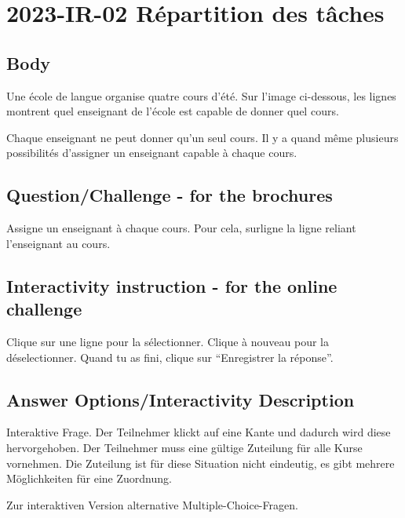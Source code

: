 \documentclass[a4paper,11pt]{report}
\newcommand{\taskGraphicsFolder}{..}
\begin{document}
\section*{\centering{} 2023-IR-02 Répartition des tâches}


\subsection*{Body}

Une école de langue organise quatre cours d’été. Sur l’image ci-dessous, les lignes montrent quel enseignant de l’école est capable de donner quel cours.

{\centering%
\par}

Chaque enseignant ne peut donner qu’un seul cours. Il y a quand même plusieurs possibilités d’assigner un enseignant capable à chaque cours.

{\em


\subsection*{Question/Challenge - for the brochures}

Assigne un enseignant à chaque cours. Pour cela, surligne la ligne reliant l’enseignant au cours.

}


\subsection*{Interactivity instruction - for the online challenge}

Clique sur une ligne pour la sélectionner. Clique à nouveau pour la déselectionner. Quand tu as fini, clique sur “Enregistrer la réponse”.

\begingroup
\renewcommand{\arraystretch}{1.5}
\subsection*{Answer Options/Interactivity Description}

Interaktive Frage. Der Teilnehmer klickt auf eine Kante und dadurch wird diese hervorgehoben. Der Teilnehmer muss eine gültige Zuteilung für alle Kurse vornehmen. Die Zuteilung ist für diese Situation nicht eindeutig, es gibt mehrere Möglichkeiten für eine Zuordnung.

Zur interaktiven Version alternative Multiple-Choice-Fragen.
\end{document}
